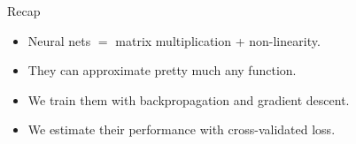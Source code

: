 \begin{frame}{Recap}
	\begin{itemize}[<+->]
		\item Neural nets $=$ matrix multiplication + non-linearity.
		\item They can approximate pretty much any function.
		\item We train them with backpropagation and gradient descent.
		\item We estimate their performance with cross-validated loss.
	\end{itemize}
\end{frame}
